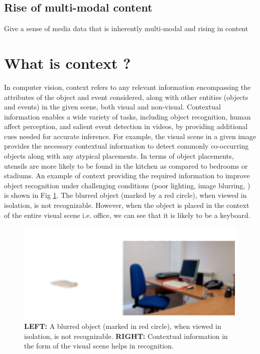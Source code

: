 \subsection{Rise of multi-modal content}
Give a sense of media data that is inherently multi-modal and rising in content

\section{What is context ?}
In computer vision, context \cite{contextvision} refers to any relevant information encompassing the attributes of the object and event considered, along with other entities (objects and events) in the given scene, both visual and non-visual. Contextual information enables a wide variety of tasks, including object recognition, human affect perception, and salient event detection in videos, by providing additional cues needed for accurate inference. For example, the visual scene in a given image provides the necessary contextual information to detect commonly co-occurring objects along with any atypical placements. In terms of object placements, utensils are more likely to be found in the kitchen as compared to bedrooms or stadiums. An example of context providing the required information to improve object recognition under challenging conditions (poor lighting, image blurring, ) is shown in Fig \ref{object recognition}. The blurred object (marked by a red circle), when viewed in isolation, is not recognizable. However, when the object is placed in the context of the entire visual scene i.e. office, we can see that it is likely to be a keyboard.
\begin{figure}
    \centering 
     \includegraphics[width=0.6\linewidth]{figures/blurred_object.png}
     \caption{ \textbf{LEFT:} A blurred object (marked in red circle), when viewed in isolation, is not recognizable. \textbf{RIGHT:} Contextual information in the form of the visual scene helps in recognition. }
     \label{object recognition}
\end{figure}

